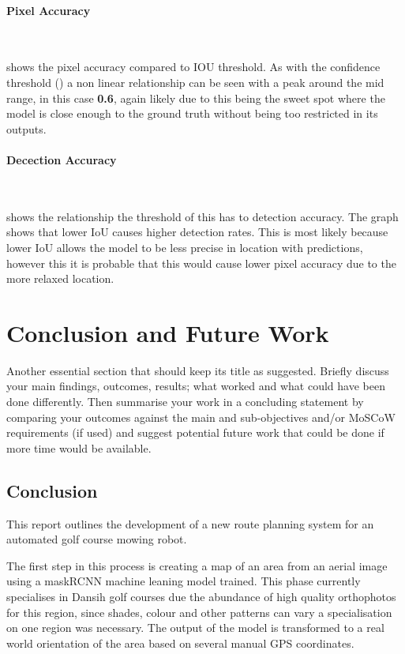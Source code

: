 \documentclass[final]{cmpreport_02}
\begin{document}
\paragraph{Pixel Accuracy} \

 shows the pixel accuracy compared to IOU threshold. 
As with the confidence threshold () a non linear relationship can be seen with a peak around the mid range, in this case \textbf{0.6}, again likely due to this being the sweet spot where the model is close enough to the ground truth without being too restricted in its outputs.

\paragraph{Decection Accuracy} \

 shows the relationship the threshold of this has to detection accuracy. 
The graph shows that lower IoU causes higher detection rates.
This is most likely because lower IoU allows the model to be less precise in location with predictions, however this it is probable that this would cause lower pixel accuracy due to the more relaxed location. 


\section{Conclusion and Future Work}


Another essential section that should keep its title as suggested. Briefly discuss your main findings, outcomes, results; what worked and what could have been done differently. Then summarise your work in a concluding statement by comparing your outcomes against the main and sub-objectives and/or MoSCoW requirements (if used) and suggest potential future work that could be done if more time would be available.

\subsection{Conclusion}
This report outlines the development of a new route planning system for an automated golf course mowing robot. 

The first step in this process is creating a map of an area from an aerial image using a maskRCNN machine leaning model trained.
This phase currently specialises in Dansih golf courses due the abundance of high quality orthophotos for this region, since shades, colour and other patterns can vary a specialisation on one region was necessary.
The output of the model is transformed to a real world orientation of the area based on several manual GPS coordinates.
\end{document}
